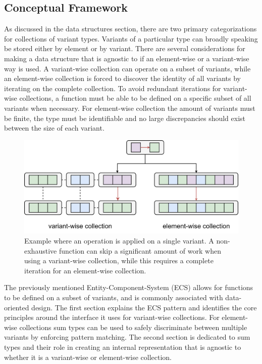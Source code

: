 \documentclass{article}
\begin{document}
\subsection{Conceptual Framework}

As discussed in the data structures section, there are two primary categorizations for collections of variant types.
Variants of a particular type can broadly speaking be stored either by element or by variant.
There are several considerations for making a data structure that is agnostic to if an element-wise or a variant-wise way is used.
A variant-wise collection can operate on a subset of variants, while an element-wise collection is forced to discover the identity of all variants by iterating on the complete collection.
To avoid redundant iterations for variant-wise collections, a function must be able to be defined on a specific subset of all variants when necessary.
For element-wise collection the amount of variants must be finite, the type must be identifiable and no large discrepancies should exist between the size of each variant.

\begin{figure}[ht]
    \centering
    \includegraphics[scale=0.06]{ConceptualFramework.png}
    \caption
    {
        Example where an operation is applied on a single variant.
        A non-exhaustive function can skip a significant amount of work when using a variant-wise collection, while this requires a complete iteration for an element-wise collection. 
    }
\end{figure}

The previously mentioned Entity-Component-System (ECS) allows for functions to be defined on a subset of variants, and is commonly associated with data-oriented design.
The first section explains the ECS pattern and identifies the core principles around the interface it uses for variant-wise collections.
For element-wise collections sum types can be used to safely discriminate between multiple variants by enforcing pattern matching.
The second section is dedicated to sum types and their role in creating an internal representation that is agnostic to whether it is a variant-wise or element-wise collection.  
\end{document}
